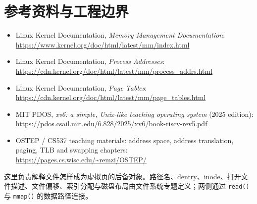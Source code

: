 \documentclass[11pt,a4paper]{ctexart}
\newcommand{\code}[1]{\texttt{#1}}
\begin{document}
\section*{参考资料与工程边界}
\small
\begin{itemize}
  \item Linux Kernel Documentation, \emph{Memory Management Documentation}: \url{https://www.kernel.org/doc/html/latest/mm/index.html}
  \item Linux Kernel Documentation, \emph{Process Addresses}: \url{https://cdn.kernel.org/doc/html/latest/mm/process_addrs.html}
  \item Linux Kernel Documentation, \emph{Page Tables}: \url{https://cdn.kernel.org/doc/html/latest/mm/page_tables.html}
  \item MIT PDOS, \emph{xv6: a simple, Unix-like teaching operating system} (2025 edition): \url{https://pdos.csail.mit.edu/6.828/2025/xv6/book-riscv-rev5.pdf}
  \item OSTEP / CS537 teaching materials: address space, address translation, paging, TLB and swapping chapters: \url{https://pages.cs.wisc.edu/~remzi/OSTEP/}
\end{itemize}

\begin{method}[与文件系统的接口]
这里负责解释文件怎样成为虚拟页的后备对象。路径名、dentry、inode、打开文件描述、文件偏移、索引分配与磁盘布局由文件系统专题定义；两侧通过 \code{read()} 与 \code{mmap()} 的数据路径连接。
\end{method}
\end{document}
